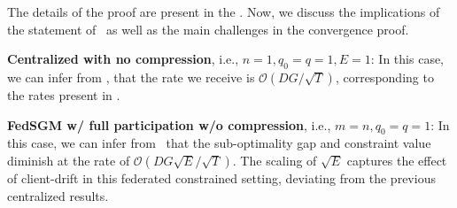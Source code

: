 \documentclass{article} %
\def\bigO{{\mathcal{O}}}
\begin{document}
The details of the proof are present in the . Now, we discuss the implications of the statement of~ as well as the main challenges in the convergence proof.

\noindent \textbf{Centralized with no compression}, i.e., $n=1, q_0=q=1, E=1$: In this case, we can infer from , that the rate we receive is $\bigO\left(DG/\sqrt{T}\right)$, corresponding to the rates present in \citet{nesterov2018lectures,lan2020algorithms,upadhyay2025optimization}.

\noindent \textbf{FedSGM w/ full participation w/o compression}, i.e., $m=n, q_0=q=1$: In this case, we can infer from~ that the sub-optimality gap and constraint value diminish at the rate of  $\bigO\left({DG\sqrt{E}}/{\sqrt{T}}\right)$. The scaling of $\sqrt{E}$ captures the effect of client-drift in this federated constrained setting, deviating from the previous centralized results.
\end{document}
